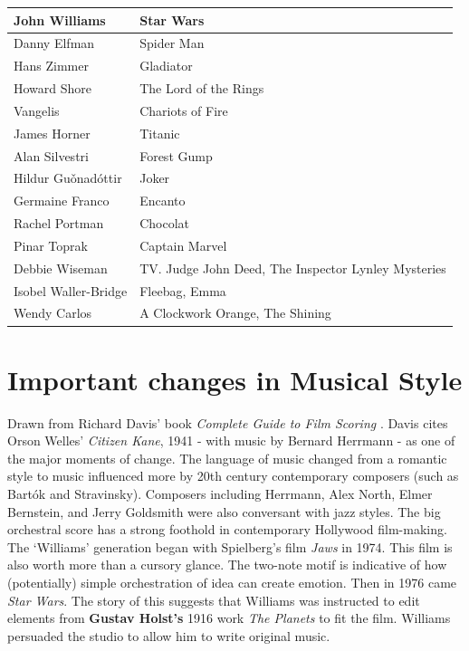 \begin{table}[H]
\begin{tabular}{|p{5.0cm}|p{8.0cm}|}
John Williams & Star Wars    \\\hline
Danny Elfman & Spider Man    \\\hline
Hans Zimmer &  Gladiator   \\\hline
Howard Shore &  The Lord of the Rings   \\\hline
Vangelis &  Chariots of Fire   \\\hline
James Horner & Titanic    \\\hline
Alan Silvestri & Forest Gump    \\\hline
Hildur Gu\v onad\' ottir & Joker    \\\hline
Germaine Franco & Encanto  \\\hline
Rachel Portman & Chocolat  \\\hline
Pinar Toprak & Captain Marvel \\\hline 
Debbie Wiseman & TV. Judge John Deed, The Inspector Lynley Mysteries \\\hline
Isobel Waller-Bridge & Fleebag, Emma \\\hline
Wendy Carlos & A Clockwork Orange, The Shining \\\hline


\end{tabular}
\label{tab:composersandfilms}
\end{table}

\section{Important changes in Musical Style}
Drawn from Richard Davis' book \textit{Complete Guide to Film Scoring} \citep{davis2010complete}. 
Davis cites Orson Welles' \textit{Citizen Kane}, 1941 - with music by Bernard Herrmann -  as one of the major moments of change. The language of music changed from a romantic style to music influenced more by 20th century contemporary composers (such as Bart\'ok and Stravinsky). Composers including Herrmann, Alex North, Elmer Bernstein, and Jerry Goldsmith were also conversant with jazz styles. The big orchestral score has a strong foothold in contemporary Hollywood film-making. The `Williams' generation began with Spielberg's film \textit{Jaws} in 1974. This film is also worth more than a cursory glance. The two-note motif is indicative of how (potentially) simple orchestration of idea can create emotion. Then in 1976 came \textit{Star Wars}. The story of this \citep[p59]{davis2010complete} suggests that Williams was instructed to edit elements from \textbf{Gustav Holst's} 1916 work \textit{The Planets} to fit the film. Williams persuaded the studio to allow him to write original music. 


